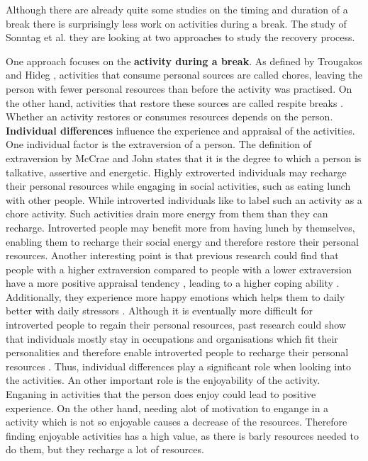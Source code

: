 \documentclass{hasel_thesis}
\begin{document}
Although there are already quite some studies on the timing and duration of a break there is surprisingly less work on activities during a break. The study of Sonntag et al. \cite{Sonnentag.2001} they are looking at two approaches to study the recovery process.

One approach focuses on the \textbf{activity during a break}. As defined by Trougakos and Hideg \cite{Trougakos.2009}, activities that consume personal sources are called chores, leaving the person with fewer personal resources than before the activity was practised. On the other hand, activities that restore these sources are called respite breaks \cite{Trougakos.2009}. Whether an activity restores or consumes resources depends on the person. \textbf{Individual differences} influence the experience and appraisal of the activities. One individual factor is the extraversion of a person. The definition of extraversion by McCrae and John \cite{McCrae.1992} states that it is the degree to which a person is talkative, assertive and energetic. Highly extroverted individuals may recharge their personal resources while engaging in social activities, such as eating lunch with other people. While introverted individuals like to label such an activity as a chore activity. Such activities drain more energy from them than they can recharge. Introverted people may benefit more from having lunch by themselves, enabling them to recharge their social energy and therefore restore their personal resources. Another interesting point is that previous research could find that people with a higher extraversion compared to people with a lower extraversion have a more positive appraisal tendency \cite{Gallagher.1990, Hemenover.1996}, leading to a higher coping ability \cite{Penley.2002}. Additionally, they experience more happy emotions which helps them to daily better with daily stressors \cite{Gallagher.1990}. Although it is eventually more difficult for introverted people to regain their personal resources, past research could show that individuals mostly stay in occupations and organisations which fit their personalities and therefore enable introverted people to recharge their personal resources \cite{Johansson.1970, Schaubroeck.1998}.
Thus, individual differences play a significant role when looking into the activities.
An other important role is the enjoyability of the activity. Enganing in activities that the person does enjoy could lead to positive experience. On the other hand, needing alot of motivation to engange in a activity which is not so enjoyable causes a decrease of the resources. Therefore finding enjoyable activities has a high value, as there is barly resources needed to do them, but they recharge a lot of resources.
\end{document}
